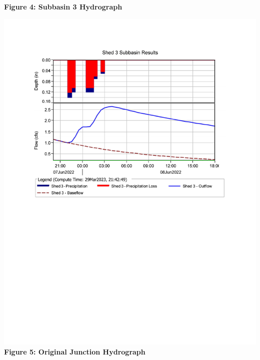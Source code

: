 \documentclass{article}
\begin{document}
\begin{center}
{\large{\bf Figure 4: Subbasin 3 Hydrograph\\}}
\includegraphics*[scale=0.7, trim = {0 12cm 0 3.1cm}]{results/Shed_3_Results.pdf}
\vspace{8mm}
{\large{\bf \\Figure 5: Original Junction Hydrograph\\}}
\vspace{1mm}

\end{center}
\end{document}
